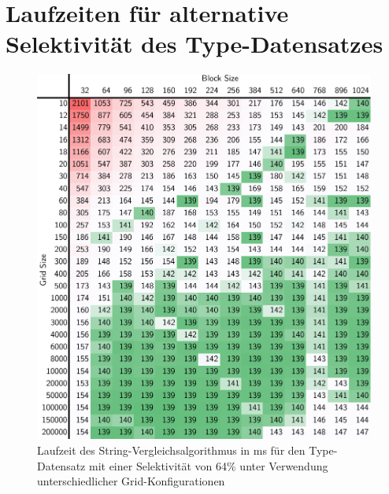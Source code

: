 


\chapter{Laufzeiten für alternative Selektivität des Type-Datensatzes}
\label{apx:parameter64}

\begin{figure}[]
	\includegraphics[]{bilder/parameter64.pdf}
	\caption{Laufzeit des String-Vergleichsalgorithmus in ms für den Type-Datensatz mit einer Selektivität von 64\% unter Verwendung unterschiedlicher Grid-Konfigurationen}
\end{figure}